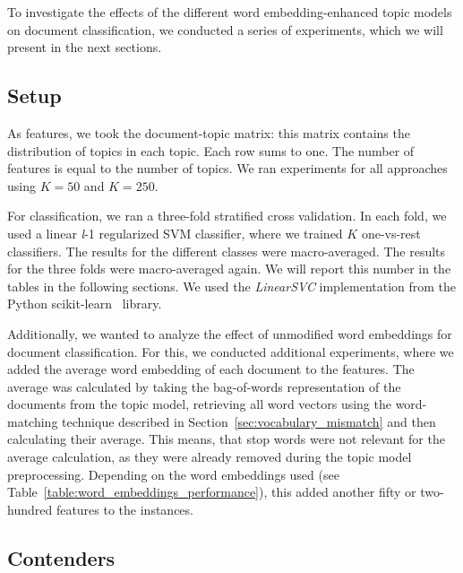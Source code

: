 \documentclass[
        a4paper,
        titlepage,
        twoside,
        parskip,
        numbers=noenddot
        ]{scrbook}
\theoremstyle{break}
\begin{document}
To investigate the effects of the different word embedding-enhanced topic models on document classification, we conducted a series of experiments, which we will present in the next sections.

\subsection{Setup}

As features, we took the document-topic matrix: this matrix contains the distribution of topics in each topic.
Each row sums to one.
The number of features is equal to the number of topics.
We ran experiments for all approaches using $K = 50$ and $K = 250$.

For classification, we ran a three-fold stratified cross validation.
In each fold, we used a linear \emph{l}-1 regularized SVM classifier, where we trained $K$ one-vs-rest classifiers.
The results for the different classes were macro-averaged.
The results for the three folds were macro-averaged again.
We will report this number in the tables in the following sections.
We used the \emph{LinearSVC} implementation from the Python scikit-learn~\cite{Pedregosa2012} library.

Additionally, we wanted to analyze the effect of unmodified word embeddings for document classification.
For this, we conducted additional experiments, where we added the average word embedding of each document to the features.
The average was calculated by taking the bag-of-words representation of the documents from the topic model, retrieving all word vectors using the word-matching technique described in Section~\ref{sec:vocabulary_mismatch} and then calculating their average.
This means, that stop words were not relevant for the average calculation, as they were already removed during the topic model preprocessing.
Depending on the word embeddings used (see Table~\ref{table:word_embeddings_performance}), this added another fifty or two-hundred features to the instances.

\subsection{Contenders}
\end{document}
